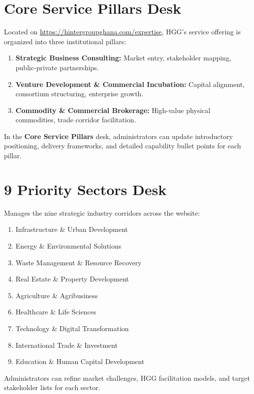 \documentclass[11pt,a4paper,oneside]{book}
\begin{document}
\section{Core Service Pillars Desk}
Located on \url{https://hintergroupghana.com/expertise}, HGG’s service offering is organized into three institutional pillars:
\begin{enumerate}
  \item \textbf{Strategic Business Consulting:} Market entry, stakeholder mapping, public-private partnerships.
  \item \textbf{Venture Development \& Commercial Incubation:} Capital alignment, consortium structuring, enterprise growth.
  \item \textbf{Commodity \& Commercial Brokerage:} High-value physical commodities, trade corridor facilitation.
\end{enumerate}
In the \textbf{Core Service Pillars} desk, administrators can update introductory positioning, delivery frameworks, and detailed capability bullet points for each pillar.

\section{9 Priority Sectors Desk}
Manages the nine strategic industry corridors across the website:
\begin{enumerate}
  \item Infrastructure \& Urban Development
  \item Energy \& Environmental Solutions
  \item Waste Management \& Resource Recovery
  \item Real Estate \& Property Development
  \item Agriculture \& Agribusiness
  \item Healthcare \& Life Sciences
  \item Technology \& Digital Transformation
  \item International Trade \& Investment
  \item Education \& Human Capital Development
\end{enumerate}
Administrators can refine market challenges, HGG facilitation models, and target stakeholder lists for each sector.
\end{document}
